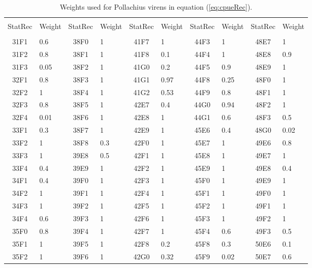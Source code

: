 \documentclass[a4paper 12pt]{article}
\numberwithin{equation}{section}
\begin{document}
 \begin{small}
\begin{table}[h!]
\centering
\caption{Weights used for Pollachius virens in equation (\ref{eq:cpueRec}).}
\begin{footnotesize}
\begin{tabular}{clclclclcl}
  \hline \\ [0.3ex]
 StatRec & Weight & StatRec & Weight & StatRec & Weight & StatRec & Weight & StatRec & Weight  \\ [1.0ex]
  \hline \\ [0.3ex]
 31F1 &  0.6 & 38F0 &    1 & 41F7 &    1 & 44F3 &    1 & 48E7 &    1 \\ 
 31F2 &  0.8 & 38F1 &    1 & 41F8 &  0.1 & 44F4 &    1 & 48E8 &  0.9 \\ 
 31F3 & 0.05 & 38F2 &    1 & 41G0 &  0.2 & 44F5 &  0.9 & 48E9 &    1 \\ 
 32F1 &  0.8 & 38F3 &    1 & 41G1 & 0.97 & 44F8 & 0.25 & 48F0 &    1 \\ 
 32F2 &    1 & 38F4 &    1 & 41G2 & 0.53 & 44F9 &  0.8 & 48F1 &    1 \\ 
 32F3 &  0.8 & 38F5 &    1 & 42E7 &  0.4 & 44G0 & 0.94 & 48F2 &    1 \\ 
 32F4 & 0.01 & 38F6 &    1 & 42E8 &    1 & 44G1 &  0.6 & 48F3 &  0.5 \\ 
 33F1 &  0.3 & 38F7 &    1 & 42E9 &    1 & 45E6 &  0.4 & 48G0 & 0.02 \\ 
 33F2 &    1 & 38F8 &  0.3 & 42F0 &    1 & 45E7 &    1 & 49E6 &  0.8 \\ 
 33F3 &    1 & 39E8 &  0.5 & 42F1 &    1 & 45E8 &    1 & 49E7 &    1 \\ 
 33F4 &  0.4 & 39E9 &    1 & 42F2 &    1 & 45E9 &    1 & 49E8 &  0.4 \\ 
 34F1 &  0.4 & 39F0 &    1 & 42F3 &    1 & 45F0 &    1 & 49E9 &    1 \\ 
 34F2 &    1 & 39F1 &    1 & 42F4 &    1 & 45F1 &    1 & 49F0 &    1 \\ 
 34F3 &    1 & 39F2 &    1 & 42F5 &    1 & 45F2 &    1 & 49F1 &    1 \\ 
 34F4 &  0.6 & 39F3 &    1 & 42F6 &    1 & 45F3 &    1 & 49F2 &    1 \\ 
 35F0 &  0.8 & 39F4 &    1 & 42F7 &    1 & 45F4 &  0.6 & 49F3 &  0.5 \\ 
 35F1 &    1 & 39F5 &    1 & 42F8 &  0.2 & 45F8 &  0.3 & 50E6 &  0.1 \\ 
 35F2 &    1 & 39F6 &    1 & 42G0 & 0.32 & 45F9 & 0.02 & 50E7 &  0.6 \\ 

\end{tabular}
\end{footnotesize}
\end{table}
\end{small}
\end{document}
